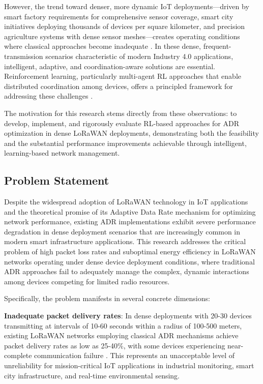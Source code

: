 \documentclass[12pt,a4paper]{article}
\begin{document}
However, the trend toward denser, more dynamic IoT deployments—driven by smart factory requirements for comprehensive sensor coverage, smart city initiatives deploying thousands of devices per square kilometer, and precision agriculture systems with dense sensor meshes—creates operating conditions where classical approaches become inadequate \cite{farooq2019survey}. In these dense, frequent-transmission scenarios characteristic of modern Industry 4.0 applications, intelligent, adaptive, and coordination-aware solutions are essential. Reinforcement learning, particularly multi-agent RL approaches that enable distributed coordination among devices, offers a principled framework for addressing these challenges \cite{busoniu2008comprehensive}.

The motivation for this research stems directly from these observations: to develop, implement, and rigorously evaluate RL-based approaches for ADR optimization in dense LoRaWAN deployments, demonstrating both the feasibility and the substantial performance improvements achievable through intelligent, learning-based network management.

\subsection{Problem Statement}
\label{subsec:problem_statement}

Despite the widespread adoption of LoRaWAN technology in IoT applications and the theoretical promise of its Adaptive Data Rate mechanism for optimizing network performance, existing ADR implementations exhibit severe performance degradation in dense deployment scenarios that are increasingly common in modern smart infrastructure applications. This research addresses the critical problem of high packet loss rates and suboptimal energy efficiency in LoRaWAN networks operating under dense device deployment conditions, where traditional ADR approaches fail to adequately manage the complex, dynamic interactions among devices competing for limited radio resources.

Specifically, the problem manifests in several concrete dimensions:

\textbf{Inadequate packet delivery rates}: In dense deployments with 20-30 devices transmitting at intervals of 10-60 seconds within a radius of 100-500 meters, existing LoRaWAN networks employing classical ADR mechanisms achieve packet delivery rates as low as 25-40\%, with some devices experiencing near-complete communication failure \cite{bor2016lora}. This represents an unacceptable level of unreliability for mission-critical IoT applications in industrial monitoring, smart city infrastructure, and real-time environmental sensing.
\end{document}
